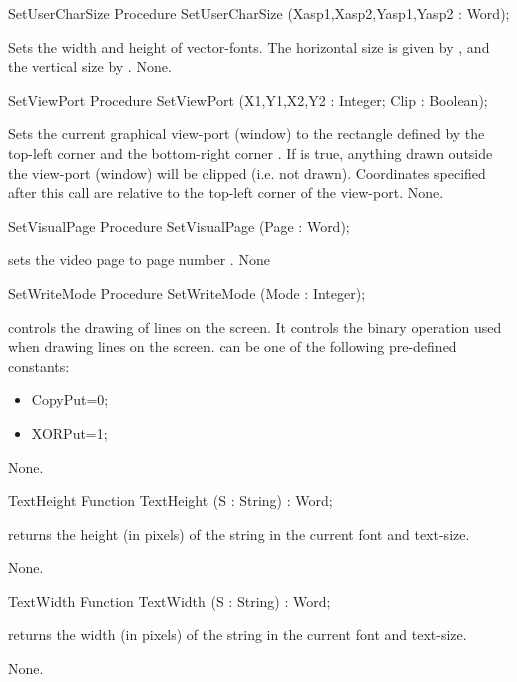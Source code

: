 \begin{procedure}{SetUserCharSize}
\Declaration
Procedure SetUserCharSize (Xasp1,Xasp2,Yasp1,Yasp2 : Word);

\Description
Sets the width and height of vector-fonts. The horizontal size is given
by , and the vertical size by .
\Errors
None.
\SeeAlso
{}
\end{procedure}
\begin{procedure}{SetViewPort}
\Declaration
Procedure SetViewPort (X1,Y1,X2,Y2 : Integer; Clip : Boolean);

\Description
Sets the current graphical view-port (window) to the rectangle defined by
the top-left corner  and the bottom-right corner .
If  is true, anything drawn outside the view-port (window) will be
clipped (i.e. not drawn). Coordinates specified after this call are relative
to the top-left corner of the view-port.
\Errors
None.
\SeeAlso
{}
\end{procedure}
\begin{procedure}{SetVisualPage}
\Declaration
Procedure SetVisualPage (Page : Word);

\Description
{} sets the video page to page number . 
\Errors
None
\SeeAlso
{}
\end{procedure}
\begin{procedure}{SetWriteMode}
\Declaration
Procedure SetWriteMode (Mode : Integer);

\Description
{} controls the drawing of lines on the screen. It controls
the binary operation used when drawing lines on the screen.  can
be one of the following pre-defined constants:
\begin{itemize}
\item CopyPut=0;
\item XORPut=1;
\end{itemize}
\Errors
None.
\SeeAlso

\end{procedure}
\begin{function}{TextHeight}
\Declaration
Function TextHeight (S : String) : Word;

\Description
{} returns the height (in pixels) of the string  in
the current font and text-size.

\Errors
None.
\SeeAlso
{}
\end{function}
\begin{function}{TextWidth}
\Declaration
Function TextWidth (S : String) : Word;

\Description
{} returns the width (in pixels) of the string  in
the current font and text-size.

\Errors
None.
\SeeAlso
{}
\end{function}

